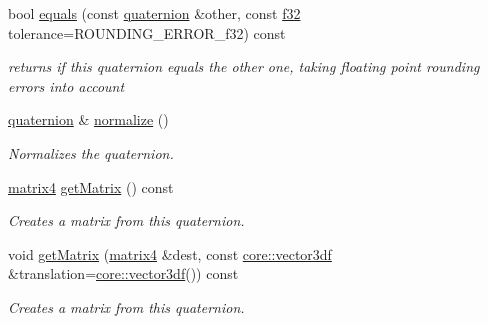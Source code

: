 \begin{DoxyCompactItemize}
\mbox{\label{classirr_1_1core_1_1quaternion_a3b659f864cfce80be65b44ecf565566c}} 
bool \hyperlink{classirr_1_1core_1_1quaternion_a3b659f864cfce80be65b44ecf565566c}{equals} (const \hyperlink{classirr_1_1core_1_1quaternion}{quaternion} \&other, const \hyperlink{namespaceirr_a0277be98d67dc26ff93b1a6a1d086b07}{f32} tolerance=R\+O\+U\+N\+D\+I\+N\+G\+\_\+\+E\+R\+R\+O\+R\+\_\+f32) const
\begin{DoxyCompactList}\small\item\em returns if this quaternion equals the other one, taking floating point rounding errors into account \end{DoxyCompactList}\item 
\mbox{\label{classirr_1_1core_1_1quaternion_a513a856a7826c7fc6d3945d8184f941a}} 
\hyperlink{classirr_1_1core_1_1quaternion}{quaternion} \& \hyperlink{classirr_1_1core_1_1quaternion_a513a856a7826c7fc6d3945d8184f941a}{normalize} ()
\begin{DoxyCompactList}\small\item\em Normalizes the quaternion. \end{DoxyCompactList}\item 
\mbox{\label{classirr_1_1core_1_1quaternion_a23c2056aa77d1d53b2cebce7cf05ea47}} 
\hyperlink{namespaceirr_1_1core_a4c9d4e29899535971052810954a14431}{matrix4} \hyperlink{classirr_1_1core_1_1quaternion_a23c2056aa77d1d53b2cebce7cf05ea47}{get\+Matrix} () const
\begin{DoxyCompactList}\small\item\em Creates a matrix from this quaternion. \end{DoxyCompactList}\item 
\mbox{\label{classirr_1_1core_1_1quaternion_a333ab73cbc2b334ea9f5fe6a5a66058e}} 
void \hyperlink{classirr_1_1core_1_1quaternion_a333ab73cbc2b334ea9f5fe6a5a66058e}{get\+Matrix} (\hyperlink{namespaceirr_1_1core_a4c9d4e29899535971052810954a14431}{matrix4} \&dest, const \hyperlink{namespaceirr_1_1core_ae6e2b2a6c552833ebbd5b7463d03586b}{core\+::vector3df} \&translation=\hyperlink{namespaceirr_1_1core_ae6e2b2a6c552833ebbd5b7463d03586b}{core\+::vector3df}()) const
\begin{DoxyCompactList}\small\item\em Creates a matrix from this quaternion. \end{DoxyCompactList}\item 

\end{DoxyCompactItemize}
